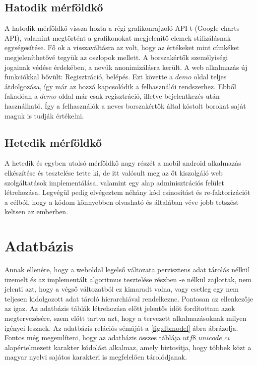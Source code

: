\documentclass[12pt]{report}
\theoremstyle{definition}
\begin{document}
	\subsection{Hatodik mérföldkő}A hatodik mérföldkő vissza hozta a régi grafikonrajzoló API-t (Google charts API), valamint megtörtént a grafikonokat megjelenítő elemek stilizálásnak egységesítése. Fő ok a visszaváltásra az volt, hogy az értékeket mint címkéket megjeleníthetővé tegyük az oszlopok mellett. A borszakértők személyiségi jogainak védése érdekében, a nevük anonimizálásra került. A web alkalmazás új funkciókkal bővült: Regisztráció, belépés. Ezt követte a $demo$ oldal teljes átdolgozása, így már az hozzá kapcsolódik a felhasználói rendszerhez. Ebből fakadóan a $demo$ oldal már csak regisztráció, illetve bejelentkezés után használható. \uppercase{í}gy a felhasználók a neves borszakértők által kóstolt borokat saját maguk is tudják értékelni.
	
	\subsection{Hetedik mérföldkő}A hetedik és egyben utolsó mérföldkő nagy részét a mobil android alkalmazás elkészítése és tesztelése tette ki, de itt valósult meg az őt kiszolgáló web szolgáltatások implementálása, valamint egy alap adminisztrációs felület létrehozása. Legvégül pedig elvégeztem néhány kód csinosítást és re-faktorizációt a célból, hogy a kódom könnyebben olvasható és általában véve jobb tetszést keltsen az emberben.
	
	\section{Adatbázis}
	Annak ellenére, hogy a weboldal legelső változata perzisztens adat tárolás nélkül üzemelt és az implementált algoritmus tesztelése részben -e nélkül zajlottak, nem jelenti azt, hogy a végső változatból ez kimaradt volna, vagy esetleg egy nem teljesen kidolgozott adat tároló hierarchiával rendelkezne. Pontosan az ellenkezője az igaz. Az adatbázis táblák létrehozása előtt jelentős időt fordítottam azok megtervezésére, szem előtt tartva azt, hogy a tervezett alkalmazásoknak milyen igényei lesznek. Az adatbázis relációs sémáját a \ref{fig:dbmodel} ábra ábrázolja. Fontos még megemlíteni, hogy az adatbázis összes táblája $utf8\_unicode\_ci$ alapértelmezett karakter kódolást alkalmaz, amely biztosítja, hogy többek közt a magyar nyelvi sajátos karakteri is megfelelően tárolódjanak.
	
\end{document}
